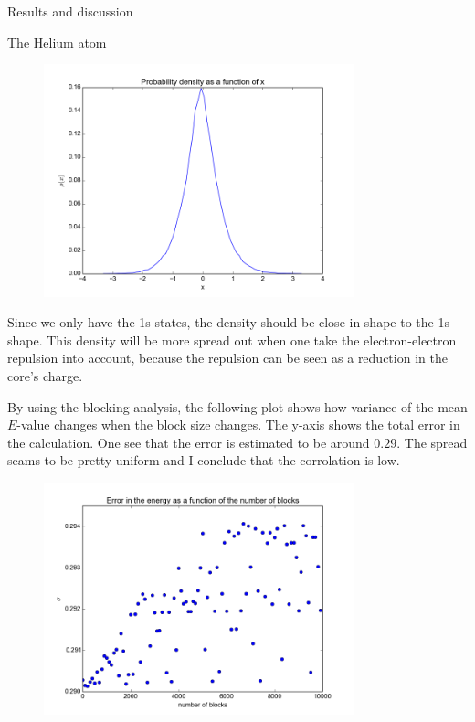 \documentclass[a4paper, 12pt, titlepage]{article}
\begin{document}
\begin{section}{Results and discussion}
\begin{subsection}{The Helium atom}
    \begin{figure}
 	\centering
 	\includegraphics[width=0.8\textwidth]{../python_programs/ProbabilityDensity.png}
    \end{figure}
	 Since we only have the 1s-states, the density should be close in shape to the 1s-shape. This density will be more spread out when one take the electron-electron repulsion into account, because the repulsion can be seen as a reduction in the core's charge. 

	 By using the blocking analysis, the following plot shows how variance of the mean $E$-value changes when the block size changes. The y-axis shows the total error in the calculation. 
	 One see that the error is estimated to be around $0.29$. The spread seams to be pretty uniform and I conclude that the corrolation is low. 
	 \begin{figure}[H] 
	 	\centering
	 	\includegraphics[width=0.8\textwidth]{../python_programs/HeliumBlocking.png}
	 \end{figure}


\end{subsection}
\end{section}
\end{document}
